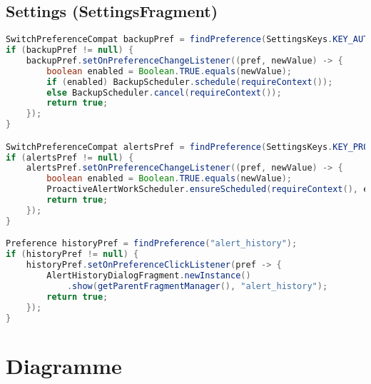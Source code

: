 \documentclass[14pt,a4paper]{report}
\begin{document}
\subsection*{Settings (SettingsFragment)}
\begin{lstlisting}[language=Java, caption={SettingsFragment.java (Auszug)}]
SwitchPreferenceCompat backupPref = findPreference(SettingsKeys.KEY_AUTO_BACKUP);
if (backupPref != null) {
    backupPref.setOnPreferenceChangeListener((pref, newValue) -> {
        boolean enabled = Boolean.TRUE.equals(newValue);
        if (enabled) BackupScheduler.schedule(requireContext());
        else BackupScheduler.cancel(requireContext());
        return true;
    });
}

SwitchPreferenceCompat alertsPref = findPreference(SettingsKeys.KEY_PROACTIVE_ALERTS_ENABLED);
if (alertsPref != null) {
    alertsPref.setOnPreferenceChangeListener((pref, newValue) -> {
        boolean enabled = Boolean.TRUE.equals(newValue);
        ProactiveAlertWorkScheduler.ensureScheduled(requireContext(), enabled);
        return true;
    });
}

Preference historyPref = findPreference("alert_history");
if (historyPref != null) {
    historyPref.setOnPreferenceClickListener(pref -> {
        AlertHistoryDialogFragment.newInstance()
            .show(getParentFragmentManager(), "alert_history");
        return true;
    });
}
\end{lstlisting}


\section{Diagramme}

\usetikzlibrary{positioning}

\end{document}

